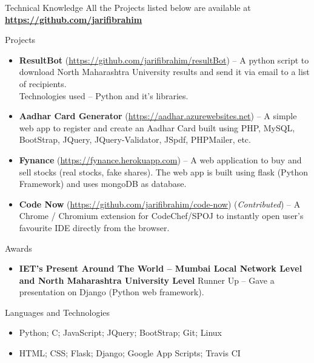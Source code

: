 \documentclass[]{mcdowellcv}
\begin{document}
	\begin{cvsection}{Technical Knowledge}{}{}
	All the Projects listed below are available at \textbf{\url{https://github.com/jarifibrahim}}   \\                                                         	\begin{cvsubsection}{Projects}{}{}
			\begin{itemize}
				\item \textbf{ResultBot}
				    (\url{https://github.com/jarifibrahim/resultBot}) -- A python script to download North Maharashtra University results and send it via email to a list of recipients. \\ Technologies used -- Python and it's libraries.
				\item \textbf{Aadhar Card Generator}
				    (\url{https://aadhar.azurewebsites.net})
					-- A simple web app to register and create an Aadhar Card built using PHP, MySQL, BootStrap, JQuery, JQuery-Validator, JSpdf, PHPMailer, etc.
			    \item \textbf{Fynance}
			        (\url{https://fynance.herokuapp.com})
			        -- A web application to buy and sell stocks (real stocks, fake shares). The web app is built using flask (Python Framework) and uses mongoDB as database.
			    \item \textbf{Code Now}
			        (\url{https://github.com/jarifibrahim/code-now}) (\textit{Contributed})
			        -- A Chrome / Chromium extension for CodeChef/SPOJ to instantly open user's favourite IDE directly from the browser.
			\end{itemize}
		\end{cvsubsection}
	\end{cvsection}
	
	\begin{cvsection}{Awards}
		\begin{cvsubsection}{}{}{}	
			\begin{itemize}
				\item \textbf{IET's Present Around The World -- Mumbai Local Network Level and North Maharashtra University Level} Runner Up -- Gave a presentation on Django (Python web framework).
			\end{itemize}
		\end{cvsubsection}
	\end{cvsection}
	
	\begin{cvsection}{Languages and Technologies}
		\begin{cvsubsection}{}{}{}	
			\begin{itemize}
				\item Python; C; JavaScript; JQuery; BootStrap; Git; Linux
				\item HTML; CSS; Flask; Django; Google App Scripts; Travis CI
			\end{itemize}
		\end{cvsubsection}
	\end{cvsection}
	
\end{document}
